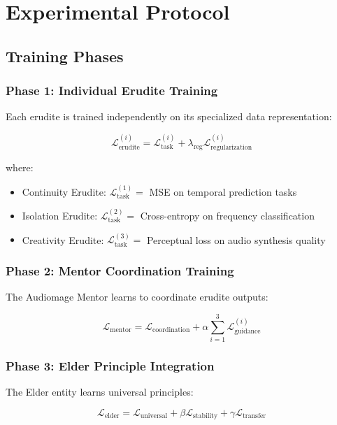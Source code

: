 \section{Experimental Protocol}

\subsection{Training Phases}

\subsubsection{Phase 1: Individual Erudite Training}
Each erudite is trained independently on its specialized data representation:

\begin{equation}
\mathcal{L}_{\text{erudite}}^{(i)} = \mathcal{L}_{\text{task}}^{(i)} + \lambda_{\text{reg}} \mathcal{L}_{\text{regularization}}^{(i)}
\end{equation}

where:
\begin{itemize}
    \item Continuity Erudite: $\mathcal{L}_{\text{task}}^{(1)} = $ MSE on temporal prediction tasks
    \item Isolation Erudite: $\mathcal{L}_{\text{task}}^{(2)} = $ Cross-entropy on frequency classification
    \item Creativity Erudite: $\mathcal{L}_{\text{task}}^{(3)} = $ Perceptual loss on audio synthesis quality
\end{itemize}

\subsubsection{Phase 2: Mentor Coordination Training}
The Audiomage Mentor learns to coordinate erudite outputs:

\begin{equation}
\mathcal{L}_{\text{mentor}} = \mathcal{L}_{\text{coordination}} + \alpha \sum_{i=1}^{3} \mathcal{L}_{\text{guidance}}^{(i)}
\end{equation}

\subsubsection{Phase 3: Elder Principle Integration}
The Elder entity learns universal principles:

\begin{equation}
\mathcal{L}_{\text{elder}} = \mathcal{L}_{\text{universal}} + \beta \mathcal{L}_{\text{stability}} + \gamma \mathcal{L}_{\text{transfer}}
\end{equation}

